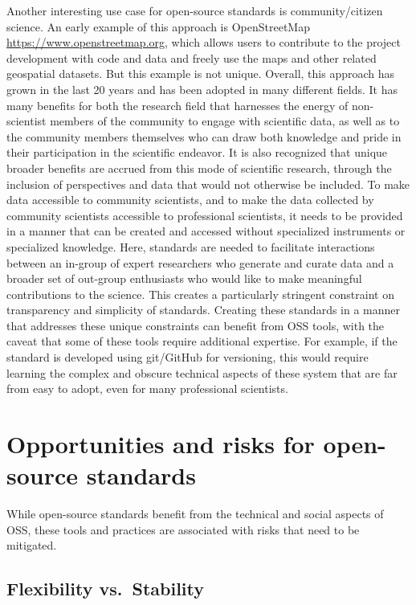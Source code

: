 \documentclass[
  number]{elsarticle}
\begin{document}
Another interesting use case for open-source standards is
community/citizen science. An early example of this approach is
OpenStreetMap \url{https://www.openstreetmap.org}, which allows users to
contribute to the project development with code and data and freely use
the maps and other related geospatial datasets. But this example is not
unique. Overall, this approach has grown in the last 20 years and has
been adopted in many different fields. It has many benefits for both the
research field that harnesses the energy of non-scientist members of the
community to engage with scientific data, as well as to the community
members themselves who can draw both knowledge and pride in their
participation in the scientific endeavor. It is also recognized that
unique broader benefits are accrued from this mode of scientific
research, through the inclusion of perspectives and data that would not
otherwise be included. To make data accessible to community scientists,
and to make the data collected by community scientists accessible to
professional scientists, it needs to be provided in a manner that can be
created and accessed without specialized instruments or specialized
knowledge. Here, standards are needed to facilitate interactions between
an in-group of expert researchers who generate and curate data and a
broader set of out-group enthusiasts who would like to make meaningful
contributions to the science. This creates a particularly stringent
constraint on transparency and simplicity of standards. Creating these
standards in a manner that addresses these unique constraints can
benefit from OSS tools, with the caveat that some of these tools require
additional expertise. For example, if the standard is developed using
git/GitHub for versioning, this would require learning the complex and
obscure technical aspects of these system that are far from easy to
adopt, even for many professional scientists.

\section{Opportunities and risks for open-source
standards}\label{sec-challenges}

While open-source standards benefit from the technical and social
aspects of OSS, these tools and practices are associated with risks that
need to be mitigated.

\subsection{Flexibility vs.~Stability}\label{flexibility-vs.-stability}
\end{document}
